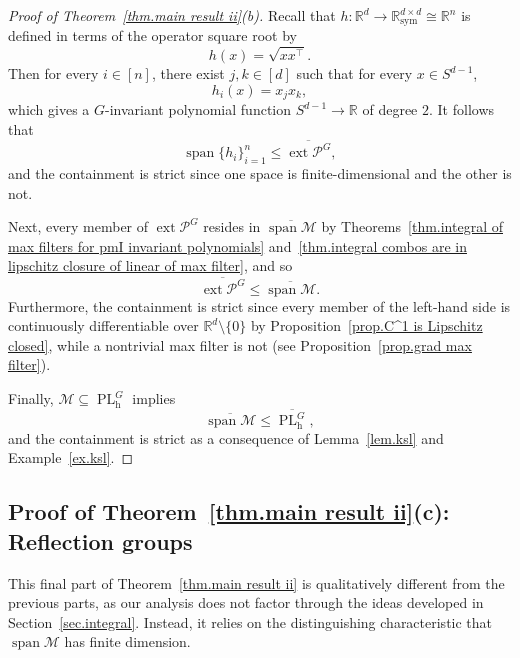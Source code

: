 \documentclass{article}
\theoremstyle{plain}
\theoremstyle{definition}
\begin{document}
\begin{proof}[Proof of Theorem~\ref{thm.main result ii}(b)]
Recall that $h\colon\mathbb{R}^d\to\mathbb{R}^{d\times d}_{\operatorname{sym}}\cong\mathbb{R}^{n}$ is defined in terms of the operator square root by
\[
h(x)
=\sqrt{xx^\top}.
\]
Then for every $i\in[n]$, there exist $j,k\in[d]$ such that for every $x \in S^{d-1}$,
\[
h_i(x)
=x_jx_k,
\]
which gives a $G$-invariant polynomial function $S^{d-1}\to\mathbb{R}$ of degree $2$.
It follows that
\[
\operatorname{span}\{h_i\}_{i=1}^n
\leq \overline{\operatorname{ext}\mathcal{P}^G},
\]
and the containment is strict since one space is finite-dimensional and the other is not. 

Next, every member of $\operatorname{ext}\mathcal{P}^G$ resides in $\overline{\operatorname{span}\mathcal{M}}$ by Theorems~\ref{thm.integral of max filters for pmI invariant polynomials} and~\ref{thm.integral combos are in lipschitz closure of linear of max filter}, and so
\[
\overline{\operatorname{ext}\mathcal{P}^G}
\leq\overline{\operatorname{span}\mathcal{M}}.
\]
Furthermore, the containment is strict since every member of the left-hand side is continuously differentiable over $\mathbb{R}^d\setminus\{0\}$ by Proposition~\ref{prop.C^1 is Lipschitz closed}, while a nontrivial max filter is not (see Proposition~\ref{prop.grad max filter}).

Finally, $\mathcal{M}\subseteq\operatorname{PL}_{\operatorname{h}}^G$ implies
\[
\overline{\operatorname{span}\mathcal{M}}
\leq \overline{\operatorname{PL}_{\operatorname{h}}^G},
\]
and the containment is strict as a consequence of Lemma~\ref{lem.ksl} and Example~\ref{ex.ksl}.
\end{proof}

\subsection{Proof of Theorem~\ref{thm.main result ii}(c): Reflection groups}

This final part of Theorem~\ref{thm.main result ii} is qualitatively different from the previous parts, as our analysis does not factor through the ideas developed in Section~\ref{sec.integral}.
Instead, it relies on the distinguishing characteristic that $\operatorname{span}\mathcal{M}$ has finite dimension.
\end{document}
